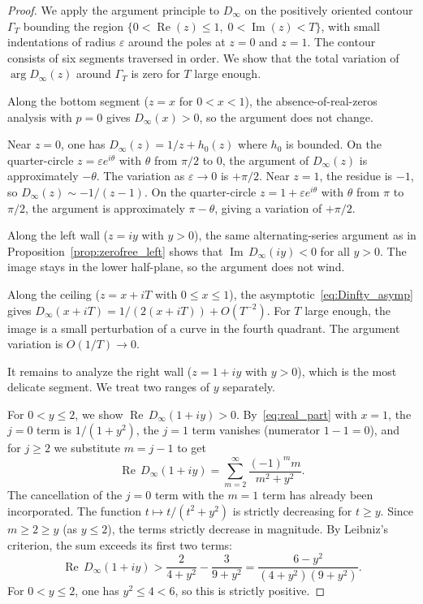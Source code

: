 \documentclass[10pt,a4paper]{amsart}
\newcommand{\Imag}{\operatorname{Im}}
\newcommand{\Real}{\operatorname{Re}}
\newcommand{\eps}{\varepsilon}
\begin{document}
\begin{proof}
We apply the argument principle to $D_\infty$ on the positively oriented contour $\Gamma_T$ bounding the region $\{0 < \Real(z) \leq 1,\; 0 < \Imag(z) < T\}$, with small indentations of radius $\eps$ around the poles at $z = 0$ and $z = 1$. The contour consists of six segments traversed in order. We show that the total variation of $\arg D_\infty(z)$ around $\Gamma_T$ is zero for $T$ large enough.

Along the bottom segment ($z = x$ for $0 < x < 1$), the absence-of-real-zeros analysis with $p = 0$ gives $D_\infty(x) > 0$, so the argument does not change.

Near $z = 0$, one has $D_\infty(z) = 1/z + h_0(z)$ where $h_0$ is bounded. On the quarter-circle $z = \eps e^{i\theta}$ with $\theta$ from $\pi/2$ to $0$, the argument of $D_\infty(z)$ is approximately $-\theta$. The variation as $\eps \to 0$ is $+\pi/2$. Near $z = 1$, the residue is $-1$, so $D_\infty(z) \sim -1/(z-1)$. On the quarter-circle $z = 1 + \eps e^{i\theta}$ with $\theta$ from $\pi$ to $\pi/2$, the argument is approximately $\pi - \theta$, giving a variation of $+\pi/2$.

Along the left wall ($z = iy$ with $y > 0$), the same alternating-series argument as in Proposition~\ref{prop:zerofree_left} shows that $\Imag\, D_\infty(iy) < 0$ for all $y > 0$. The image stays in the lower half-plane, so the argument does not wind.

Along the ceiling ($z = x + iT$ with $0 \leq x \leq 1$), the asymptotic~\eqref{eq:Dinfty_asymp} gives $D_\infty(x+iT) = 1/(2(x+iT)) + O(T^{-2})$. For $T$ large enough, the image is a small perturbation of a curve in the fourth quadrant. The argument variation is $O(1/T) \to 0$.

It remains to analyze the right wall ($z = 1 + iy$ with $y > 0$), which is the most delicate segment. We treat two ranges of $y$ separately.

For $0 < y \leq 2$, we show $\Real\, D_\infty(1+iy) > 0$. By~\eqref{eq:real_part} with $x = 1$, the $j=0$ term is $1/(1+y^2)$, the $j=1$ term vanishes (numerator $1-1=0$), and for $j \geq 2$ we substitute $m = j-1$ to get
$$
\Real\, D_\infty(1+iy) = \sum_{m=2}^{\infty} \frac{(-1)^m m}{m^2 + y^2}.
$$
The cancellation of the $j=0$ term with the $m=1$ term has already been incorporated. The function $t \mapsto t/(t^2 + y^2)$ is strictly decreasing for $t \geq y$. Since $m \geq 2 \geq y$ (as $y \leq 2$), the terms strictly decrease in magnitude. By Leibniz's criterion, the sum exceeds its first two terms:
$$
\Real\, D_\infty(1+iy) > \frac{2}{4+y^2} - \frac{3}{9+y^2} = \frac{6-y^2}{(4+y^2)(9+y^2)}.
$$
For $0 < y \leq 2$, one has $y^2 \leq 4 < 6$, so this is strictly positive.


\end{proof}
\end{document}
